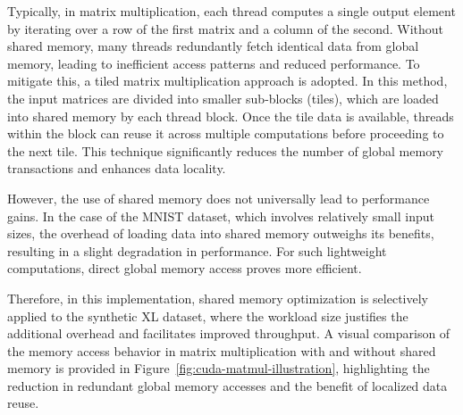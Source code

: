 \documentclass[modern,longauthor]{aastex7}
\begin{document}
Typically, in matrix multiplication, each thread computes a single output element by iterating over a row of the first matrix and a column of the second. Without shared memory, many threads redundantly fetch identical data from global memory, leading to inefficient access patterns and reduced performance. To mitigate this, a tiled matrix multiplication approach is adopted. In this method, the input matrices are divided into smaller sub-blocks (tiles), which are loaded into shared memory by each thread block. Once the tile data is available, threads within the block can reuse it across multiple computations before proceeding to the next tile. This technique significantly reduces the number of global memory transactions and enhances data locality.

However, the use of shared memory does not universally lead to performance gains. In the case of the MNIST dataset, which involves relatively small input sizes, the overhead of loading data into shared memory outweighs its benefits, resulting in a slight degradation in performance. For such lightweight computations, direct global memory access proves more efficient.

Therefore, in this implementation, shared memory optimization is selectively applied to the synthetic XL dataset, where the workload size justifies the additional overhead and facilitates improved throughput. A visual comparison of the memory access behavior in matrix multiplication with and without shared memory is provided in Figure~\ref{fig:cuda-matmul-illustration}, highlighting the reduction in redundant global memory accesses and the benefit of localized data reuse.
\end{document}
